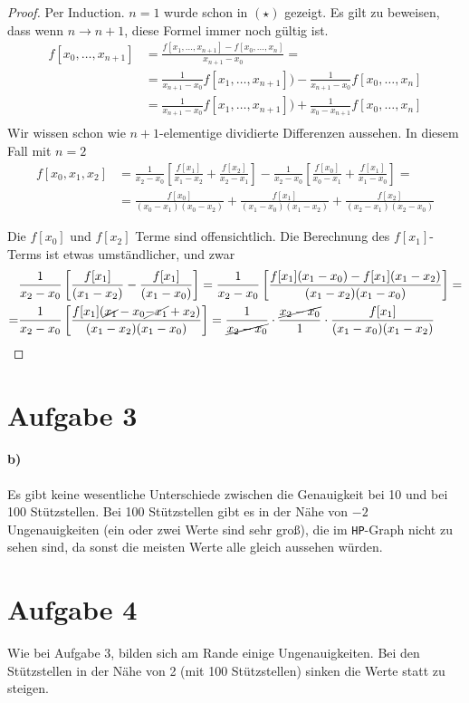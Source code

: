 \documentclass[a4paper,ngerman]{scrartcl}
\begin{document}
\begin{proof}
  Per Induction. $n=1$ wurde schon in $( \star)$ gezeigt. Es gilt zu beweisen, dass wenn
  $n\to n+1$, diese Formel immer noch gültig ist.
\begin{align*}
  f[x_0,\dots,x_{n+1}] &= \frac{f[x_1,\dots,x_{n+1}] - f[x_0,\dots,x_n]}{x_{n+1}-x_0}=\\
  &=\frac{1}{x_{n+1}-x_0}f[x_1,\dots,x_{n+1}]) - \frac{1}{x_{n+1}-x_0}f[x_0,\dots,x_n]\\
  &= \frac{1}{x_{n+1}-x_0}f[x_1,\dots,x_{n+1}]) + \frac{1}{x_{0}-x_{n+1}}f[x_0,\dots,x_n]\\
\end{align*}
Wir wissen schon wie $n+1$-elementige dividierte Differenzen
aussehen. In diesem Fall mit $n=2$
\begin{align*}
f[x_0,x_1,x_2]  &= \frac{1}{x_{2}-x_0}\left[ \frac{f[x_1]}{x_1-x_2} + \frac{f[x_2]}{x_2-x_1}\right] -
\frac{1}{x_{2}-x_0}\left[ \frac{f[x_0]}{x_0-x_1} + \frac{f[x_1]}{x_1-x_0}\right] =\\
&= \frac{f[x_0]}{(x_0-x_1)(x_0-x_2)} + \frac{f[x_1]}{(x_1-x_0)(x_1-x_2)} + \frac{f[x_2]}{(x_2-x_1)(x_2-x_0)}
\end{align*}

Die $f[x_0]$ und $f[x_2]$ Terme sind offensichtlich. Die Berechnung
des $f[x_1]$-Terms ist etwas umständlicher, und zwar
\begin{align*}
&  \frac{1}{x_2-x_0}\left[\frac{f[x_1]}{(x_1-x_2)}-\frac{f[x_1]}{(x_1-x_0)}\right] =
\frac{1}{x_2-x_0}\left[\frac{f[x_1](x_1-x_0)-f[x_1](x_1-x_2)}{(x_1-x_2)(x_1-x_0)}\right] =\\
=& \frac{1}{x_2-x_0}\left[ \frac{f[x_1](\cancel{x_1}-x_0\cancel{-x_1}+x_2)}{(x_1-x_2)(x_1-x_0)} \right] =
\frac{1}{\cancel{x_2-x_0}}\cdot \frac{\cancel{x_2-x_0}}{1}\cdot \frac{f[x_1]}{(x_1-x_0)(x_1-x_2)}
\end{align*}
\end{proof}

\section*{Aufgabe 3}

\paragraph{b)}

Es gibt keine wesentliche Unterschiede zwischen die Genauigkeit bei 10
und bei 100 Stützstellen. Bei 100 Stützstellen gibt es in der Nähe von
$-2$ Ungenauigkeiten (ein oder zwei Werte sind sehr groß), die im
\texttt{HP}-Graph nicht zu sehen sind, da sonst die meisten Werte alle
gleich aussehen würden.

\section*{Aufgabe 4}

Wie bei Aufgabe 3, bilden sich am Rande einige Ungenauigkeiten. Bei
den Stützstellen in der Nähe von 2 (mit 100 Stützstellen) sinken die
Werte statt zu steigen.
\end{document}
